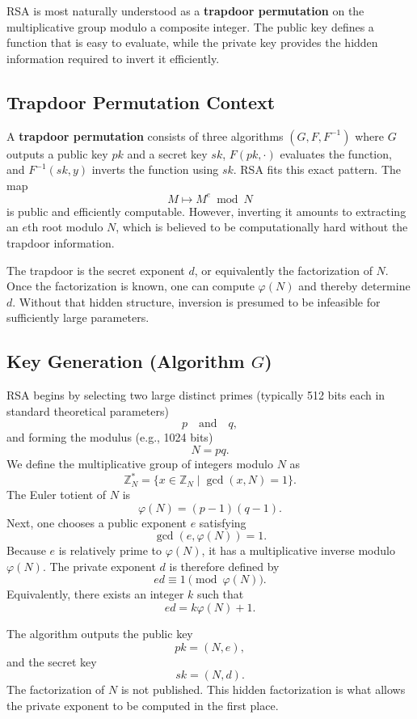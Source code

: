 RSA is most naturally understood as a \textbf{trapdoor permutation} on the multiplicative group modulo a composite integer. The public key defines a function that is easy to evaluate, while the private key provides the hidden information required to invert it efficiently.

\subsection{Trapdoor Permutation Context}

A \textbf{trapdoor permutation} consists of three algorithms $(G, F, F^{-1})$ where $G$ outputs a public key $pk$ and a secret key $sk$, $F(pk, \cdot)$ evaluates the function, and $F^{-1}(sk, y)$ inverts the function using $sk$. RSA fits this exact pattern. The map
\[
M \mapsto M^e \bmod N
\]
is public and efficiently computable. However, inverting it amounts to extracting an $e$th root modulo $N$, which is believed to be computationally hard without the trapdoor information.

The trapdoor is the secret exponent $d$, or equivalently the factorization of $N$. Once the factorization is known, one can compute $\varphi(N)$ and thereby determine $d$. Without that hidden structure, inversion is presumed to be infeasible for sufficiently large parameters.

\subsection{Key Generation (Algorithm $G$)}

RSA begins by selecting two large distinct primes (typically 512 bits each in standard theoretical parameters)
\[
p \quad \text{and} \quad q,
\]
and forming the modulus (e.g., 1024 bits)
\[
N = pq.
\]
We define the multiplicative group of integers modulo $N$ as
\[
\mathbb{Z}_N^{\ast} = \{x \in \mathbb{Z}_N \mid \gcd(x, N) = 1\}.
\]
The Euler totient of $N$ is
\[
\varphi(N) = (p-1)(q-1).
\]
Next, one chooses a public exponent $e$ satisfying
\[
\gcd(e,\varphi(N)) = 1.
\]
Because $e$ is relatively prime to $\varphi(N)$, it has a multiplicative inverse modulo $\varphi(N)$. The private exponent $d$ is therefore defined by
\[
ed \equiv 1 \pmod{\varphi(N)}.
\]
Equivalently, there exists an integer $k$ such that
\[
ed = k\varphi(N) + 1.
\]

The algorithm outputs the public key
\[
pk = (N,e),
\]
and the secret key
\[
sk = (N,d).
\]
The factorization of $N$ is not published. This hidden factorization is what allows the private exponent to be computed in the first place.

